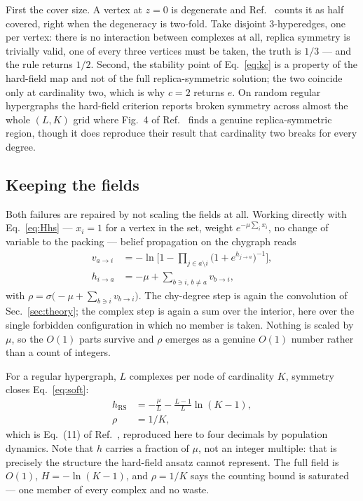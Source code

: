 \documentclass[aps,pre,twocolumn,superscriptaddress,floatfix]{revtex4-2}
\begin{document}
First the cover size. A vertex at $z=0$ is degenerate and Ref.~\cite{VW03}
counts it as half covered, right when the degeneracy is two-fold. Take disjoint
$3$-hyperedges, one per vertex: there is no interaction between complexes at
all, replica symmetry is trivially valid, one of every three vertices must be
taken, the truth is $1/3$ --- and the rule returns $1/2$. Second, the stability
point of Eq.~\eqref{eq:kc} is a property of the hard-field map and not of the
full replica-symmetric solution; the two coincide only at cardinality two, which
is why $c=2$ returns $e$. On random regular hypergraphs the hard-field criterion
reports broken symmetry across almost the whole $(L,K)$ grid where Fig.~4 of
Ref.~\cite{MT07} finds a genuine replica-symmetric region, though it does
reproduce their result that cardinality two breaks for every degree.

\subsection{Keeping the fields}
\label{sec:soft}

Both failures are repaired by not scaling the fields at all. Working directly
with Eq.~\eqref{eq:Hhs} --- $x_i=1$ for a vertex in the set, weight
$e^{-\mu\sum_ix_i}$, no change of variable to the packing --- belief propagation
on the chygraph reads
\begin{align}
  v_{a\to i}&=-\ln\Big[1-\prod_{j\in a\setminus i}\big(1+e^{h_{j\to a}}\big)^{-1}\Big],
  \nonumber\\
  h_{i\to a}&=-\mu+\sum_{b\ni i,\,b\neq a}v_{b\to i},
  \label{eq:soft}
\end{align}
with $\rho=\sigma\big(-\mu+\sum_{b\ni i}v_{b\to i}\big)$. The chy-degree step is
again the convolution of Sec.~\ref{sec:theory}; the complex step is again a sum
over the interior, here over the single forbidden configuration in which no
member is taken. Nothing is scaled by $\mu$, so the $O(1)$ parts survive and
$\rho$ emerges as a genuine $O(1)$ number rather than a count of integers.

For a regular hypergraph, $L$ complexes per node of cardinality $K$, symmetry
closes Eq.~\eqref{eq:soft}:
\begin{equation}
  \begin{split}
    h_{\mathrm{RS}}&=-\frac{\mu}{L}-\frac{L-1}{L}\ln(K-1),\\
    \rho&=1/K,
  \end{split}
  \label{eq:hRS}
\end{equation}
which is Eq.~(11) of Ref.~\cite{MT07}, reproduced here to four decimals by
population dynamics. Note that $h$ carries a fraction of $\mu$, not an integer
multiple: that is precisely the structure the hard-field ansatz cannot
represent. The full field is $O(1)$, $H=-\ln(K-1)$, and $\rho=1/K$ says the
counting bound is saturated --- one member of every complex and no waste.
\end{document}
